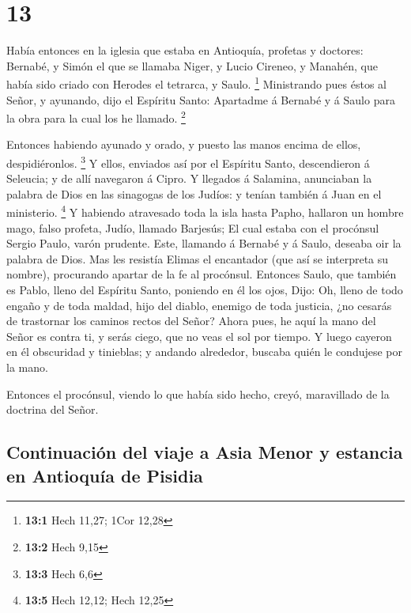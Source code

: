 \hypertarget{section-12}{%
\section{13}\label{section-12}}

 Había entonces en la iglesia que estaba en Antioquía,
profetas y doctores: Bernabé, y Simón el que se llamaba Niger, y Lucio
Cireneo, y Manahén, que había sido criado con Herodes el tetrarca, y
Saulo. \footnote{\textbf{13:1} Hech 11,27; 1Cor 12,28} 
Ministrando pues éstos al Señor, y ayunando, dijo el Espíritu Santo:
Apartadme á Bernabé y á Saulo para la obra para la cual los he llamado.
\footnote{\textbf{13:2} Hech 9,15}

 Entonces habiendo ayunado y orado, y puesto las manos
encima de ellos, despidiéronlos. \footnote{\textbf{13:3} Hech 6,6}
 Y ellos, enviados así por el Espíritu Santo, descendieron á
Seleucia; y de allí navegaron á Cipro.  Y llegados á
Salamina, anunciaban la palabra de Dios en las sinagogas de los Judíos:
y tenían también á Juan en el ministerio. \footnote{\textbf{13:5} Hech
  12,12; Hech 12,25}  Y habiendo atravesado toda la isla
hasta Papho, hallaron un hombre mago, falso profeta, Judío, llamado
Barjesús;  El cual estaba con el procónsul Sergio Paulo,
varón prudente. Este, llamando á Bernabé y á Saulo, deseaba oir la
palabra de Dios.  Mas les resistía Elimas el encantador (que
así se interpreta su nombre), procurando apartar de la fe al procónsul.
 Entonces Saulo, que también es Pablo, lleno del Espíritu
Santo, poniendo en él los ojos,  Dijo: Oh, lleno de todo
engaño y de toda maldad, hijo del diablo, enemigo de toda justicia, ¿no
cesarás de trastornar los caminos rectos del Señor?  Ahora
pues, he aquí la mano del Señor es contra ti, y serás ciego, que no veas
el sol por tiempo. Y luego cayeron en él obscuridad y tinieblas; y
andando alrededor, buscaba quién le condujese por la mano.

 Entonces el procónsul, viendo lo que había sido hecho,
creyó, maravillado de la doctrina del Señor.

\hypertarget{continuaciuxf3n-del-viaje-a-asia-menor-y-estancia-en-antioquuxeda-de-pisidia}{%
\subsection{Continuación del viaje a Asia Menor y estancia en Antioquía
de
Pisidia}\label{continuaciuxf3n-del-viaje-a-asia-menor-y-estancia-en-antioquuxeda-de-pisidia}}

